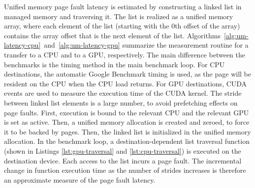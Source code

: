 Unified memory page fault latency is estimated by constructing a linked list in managed memory and traversing it.
The list is realized as a unified memory array, where each element of the list (starting with the 0th offset of the array) contains the array offset that is the next element of the list.
Algorithms~\ref{alg:um-latency-cpu}~and~\ref{alg:um-latency-gpu} summarize the measurement routine for a transfer to a CPU and to a GPU, respectively.
The main difference between the benchmarks is the timing method in the main benchmark loop.
For CPU destinations, the automatic Google Benchmark timing is used, as the page will be resident on the CPU when the CPU load returns.
For GPU destinations, CUDA events are used to measure the execution time of the CUDA kernel.
The stride between linked list elements is a large number, to avoid prefetching effects on page faults.
First, execution is bound to the relevant CPU and the relevant GPU is set as active.
Then, a unified memory allocation is created and zeroed, to force it to be backed by pages.
Then, the linked list is initialized in the unified memory allocation.
In the benchmark loop, a destination-dependent list traversal function (shown in Listings \ref{lst:gpu-traversal} and \ref{lst:cpu-traversal}) is executed on the destination device.
Each access to the list incurs a page fault.
The incremental change in function execution time as the number of strides increases is therefore an approximate measure of the page fault latency.


